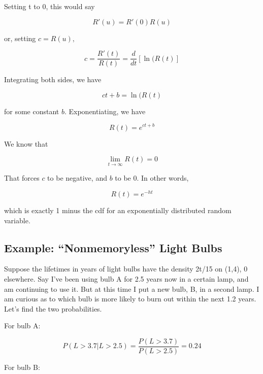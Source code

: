 Setting t to 0, this would say

\begin{equation}
R\prime(u) = R\prime(0) R(u)
\end{equation}

or, setting $c = R(u),$

\begin{equation}
c = \frac{R'(t)}{R(t)} = \frac{d}{dt} [\ln(R(t)]
\end{equation}

Integrating both sides, we have

\begin{equation}
ct +b = \ln(R(t)
\end{equation}

for some constant $b$.  Exponentiating, we have

\begin{equation}
R(t) = e^{ct+b}
\end{equation}

We know that 

\begin{equation}
\lim_{t \rightarrow \infty} R(t) = 0
\end{equation}

That forces $c$ to be negative, and $b$ to be 0.  In other words,

\begin{equation}
R(t) = e^{-ht}  
\end{equation}

which is exactly 1 minus the cdf for an exponentially distributed random
variable.  

\subsection{Example:  ``Nonmemoryless'' Light Bulbs}

Suppose the lifetimes in years of light bulbs have the density 2t/15 on
(1,4), 0 elsewhere.  Say I've been using bulb A for 2.5 years now in a
certain lamp, and am continuing to use it.  But at this time I put a new
bulb, B, in a second lamp.  I am curious as to which bulb is more likely
to burn out within the next 1.2 years.  Let's find the two
probabilities.

For bulb A:

\begin{equation}
P(L > 3.7 | L > 2.5) =
\frac{P(L > 3.7)}{P(L > 2.5)} =
0.24
\end{equation}

For bulb B:

